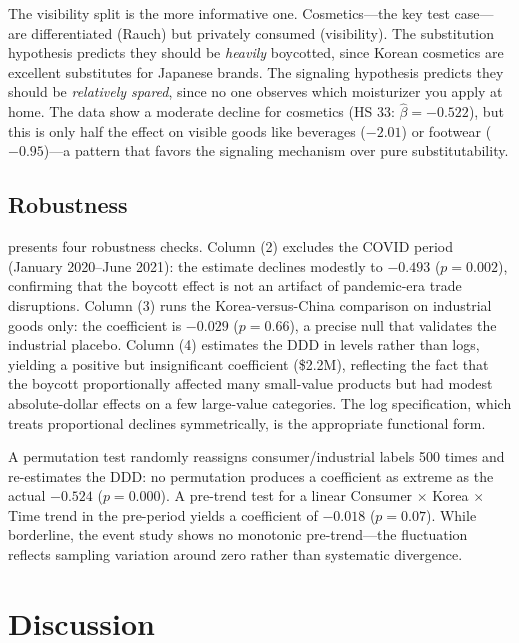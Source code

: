 \documentclass[12pt]{article}
\begin{document}
The visibility split is the more informative one. Cosmetics---the key test case---are differentiated (Rauch) but privately consumed (visibility). The substitution hypothesis predicts they should be \textit{heavily} boycotted, since Korean cosmetics are excellent substitutes for Japanese brands. The signaling hypothesis predicts they should be \textit{relatively spared}, since no one observes which moisturizer you apply at home. The data show a moderate decline for cosmetics (HS 33: $\hat{\beta} = -0.522$), but this is only half the effect on visible goods like beverages ($-2.01$) or footwear ($-0.95$)---a pattern that favors the signaling mechanism over pure substitutability.



\subsection{Robustness}

 presents four robustness checks. Column (2) excludes the COVID period (January 2020--June 2021): the estimate declines modestly to $-0.493$ ($p = 0.002$), confirming that the boycott effect is not an artifact of pandemic-era trade disruptions. Column (3) runs the Korea-versus-China comparison on industrial goods only: the coefficient is $-0.029$ ($p = 0.66$), a precise null that validates the industrial placebo. Column (4) estimates the DDD in levels rather than logs, yielding a positive but insignificant coefficient (\$2.2M), reflecting the fact that the boycott proportionally affected many small-value products but had modest absolute-dollar effects on a few large-value categories. The log specification, which treats proportional declines symmetrically, is the appropriate functional form.

A permutation test randomly reassigns consumer/industrial labels 500 times and re-estimates the DDD: no permutation produces a coefficient as extreme as the actual $-0.524$ ($p = 0.000$). A pre-trend test for a linear Consumer $\times$ Korea $\times$ Time trend in the pre-period yields a coefficient of $-0.018$ ($p = 0.07$). While borderline, the event study shows no monotonic pre-trend---the fluctuation reflects sampling variation around zero rather than systematic divergence.




\section{Discussion}
\end{document}
